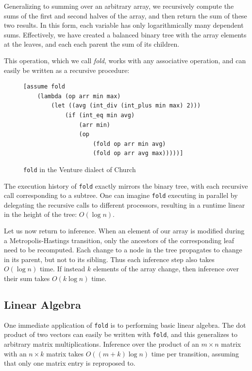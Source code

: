 \documentclass[11pt]{article}
\begin{document}
Generalizing to summing over an arbitrary array, we recursively compute the sums of the first and second halves of the array, and then return the sum of these two results. In this form, each variable has only logarithmically many dependent sums. Effectively, we have created a balanced binary tree with the array elements at the leaves, and each each parent the sum of its children.

This operation, which we call \emph{fold}, works with any associative operation, and can easily be written as a recursive procedure:

\begin{figure}[h]
\begin{center}
\begin{verbatim}
[assume fold
    (lambda (op arr min max)
        (let ((avg (int_div (int_plus min max) 2)))
            (if (int_eq min avg)
                (arr min)
                (op
                    (fold op arr min avg)
                    (fold op arr avg max)))))]
\end{verbatim}
\end{center}
\caption{\texttt{fold} in the Venture dialect of Church}
\end{figure}

The execution history of \texttt{fold} exactly mirrors the binary tree, with each recursive call corresponding to a subtree. One can imagine \texttt{fold} executing in parallel by delegating the recursive calls to different processors, resulting in a runtime linear in the height of the tree: $O(\log n)$.

Let us now return to inference. When an element of our array is modified during a Metropolis-Hastings transition, only the ancestors of the corresponding leaf need to be recomputed. Each change to a node in the tree propagates to change in its parent, but not to its sibling. Thus each inference step also takes $O(\log n)$ time. If instead $k$ elements of the array change, then inference over their sum takes $O(k\log n)$ time.

\subsection{Linear Algebra}

One immediate application of \texttt{fold} is to performing basic linear algebra. The dot product of two vectors can easily be written with \texttt{fold}, and this generalizes to arbitrary matrix multiplications. Inference over the product of an $m\times n$ matrix with an $n\times k$ matrix takes $O((m+k)\log n)$ time per transition, assuming that only one matrix entry is reproposed to.
\end{document}
